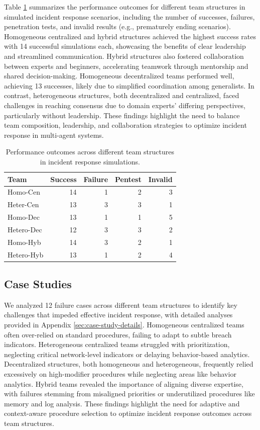 \documentclass[letterpaper]{article} %
\begin{document}
Table \ref{tab:results} summarizes the performance outcomes for different team structures in simulated incident response scenarios, including the number of successes, failures, penetration tests, and invalid results (e.g., prematurely ending scenarios). Homogeneous centralized and hybrid structures achieved the highest success rates with 14 successful simulations each, showcasing the benefits of clear leadership and streamlined communication. Hybrid structures also fostered collaboration between experts and beginners, accelerating teamwork through mentorship and shared decision-making. Homogeneous decentralized teams performed well, achieving 13 successes, likely due to simplified coordination among generalists. In contrast, heterogeneous structures, both decentralized and centralized, faced challenges in reaching consensus due to domain experts' differing perspectives, particularly without leadership. These findings highlight the need to balance team composition, leadership, and collaboration strategies to optimize incident response in multi-agent systems.

\begin{table}[h!]
\centering
\begin{tabular}{lrrrr}
\toprule
\textbf{Team} & \textbf{Success} & \textbf{Failure} & \textbf{Pentest} & \textbf{Invalid} \\
\midrule
Homo-Cen & 14 & 1 & 2 & 3 \\
Heter-Cen & 13 & 3 & 3 & 1 \\
Homo-Dec & 13 & 1 & 1 & 5 \\
Hetero-Dec & 12 & 3 & 3 & 2 \\
Homo-Hyb & 14 & 3 & 2 & 1 \\
Hetero-Hyb & 13 & 1 & 2 & 4 \\
\bottomrule
\end{tabular}
\caption{Performance outcomes across different team structures in incident response simulations.}
\label{tab:results}
\end{table}

\subsection{Case Studies}

We analyzed 12 failure cases across different team structures to identify key challenges that impeded effective incident response, with detailed analyses provided in Appendix \ref{sec:case-study-details}. Homogeneous centralized teams often over-relied on standard procedures, failing to adapt to subtle breach indicators. Heterogeneous centralized teams struggled with prioritization, neglecting critical network-level indicators or delaying behavior-based analytics. Decentralized structures, both homogeneous and heterogeneous, frequently relied excessively on high-modifier procedures while neglecting areas like behavior analytics. Hybrid teams revealed the importance of aligning diverse expertise, with failures stemming from misaligned priorities or underutilized procedures like memory and log analysis. These findings highlight the need for adaptive and context-aware procedure selection to optimize incident response outcomes across team structures.
\end{document}
